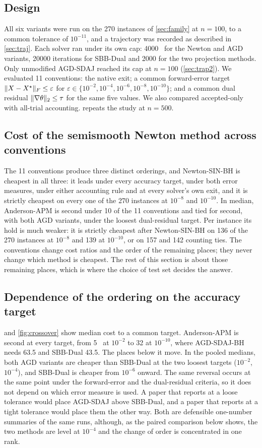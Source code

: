 \subsection{Design}
All six variants were run on the 270 instances of \cref{sec:family} at
$n=100$, to a common tolerance of $10^{-11}$, and a trajectory was recorded as
described in \cref{sec:traj}. Each solver ran under its own cap: 4000 \EVDs\
for the Newton and AGD variants, 20000 iterations for SBB-Dual and 2000 for the
two projection methods. Only unmodified AGD-SDAJ reached its cap at $n=100$
(\cref{sec:trap2}). We evaluated 11
conventions: the native exit; a common forward-error target
$\lVert X-X^\star\rVert_F\le\varepsilon$ for
$\varepsilon\in\{10^{-2},10^{-4},10^{-6},10^{-8},10^{-10}\}$; and a common
dual residual $\lVert \nabla\theta\rVert_2\le\tau$ for the same five values. We also
compared accepted-only with all-trial accounting.
 repeats the study at $n=500$.

\subsection{Cost of the semismooth Newton method across conventions}\label{sec:winner}
The 11 conventions produce three distinct orderings, and Newton-SIN-BH is
cheapest in all three: it leads under every accuracy target, under both error
measures, under either accounting rule and at every solver's own exit, and it
is strictly cheapest on every one of the 270 instances at $10^{-8}$ and
$10^{-10}$. In median, Anderson-APM is second under 10 of the 11 conventions
and tied for second, with both AGD variants, under the loosest dual-residual
target. Per instance its hold is much weaker: it is strictly cheapest after
Newton-SIN-BH on 136 of the 270 instances at $10^{-8}$ and 139 at $10^{-10}$,
or on 157 and 142 counting ties. The conventions
change cost ratios and the order of the remaining places; they never change
which method is cheapest. The rest of this section is about those remaining
places, which is where the choice of test set decides the answer.

\subsection{Dependence of the ordering on the accuracy target}
 and \cref{fig:crossover} show median cost to a common
target. Anderson-APM is second at every target, from 5 \EVDs\ at $10^{-2}$ to 32
at $10^{-10}$, where AGD-SDAJ-BH needs 63.5 and SBB-Dual 43.5. The places
below it move. In the pooled medians, both AGD variants are cheaper than
SBB-Dual at the two loosest targets ($10^{-2}$, $10^{-4}$), and SBB-Dual is
cheaper from $10^{-6}$ onward. The same reversal
occurs at the same point under the forward-error and the dual-residual
criteria, so it does not depend on which error measure is used. A paper that
reports at a loose tolerance would place AGD-SDAJ above SBB-Dual, and a paper
that reports at a tight tolerance would place them the other way. Both are
defensible one-number summaries of the same runs, although, as the paired
comparison below shows, the two methods are level at $10^{-4}$ and the change
of order is concentrated in one rank.

